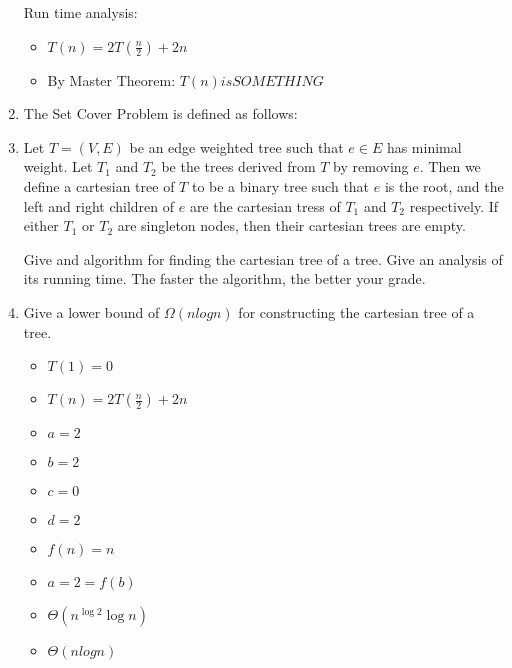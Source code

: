 \documentclass[12pt]{article}
\begin{document}
\begin{enumerate}
    Run time analysis:
    \begin{itemize}
        \item $T(n) = 2T(\frac{n}{2}) + 2n$
        \item By Master Theorem: $T(n) is SOMETHING$
    \end{itemize}

\item The Set Cover Problem is defined as follows:

\item Let $T = (V,E)$ be an edge weighted tree such that $e \in E$ has minimal
    weight.  Let $T_1$ and $T_2$ be the trees derived from $T$ by removing $e$.
    Then we define a cartesian tree of $T$ to be a binary tree such that $e$ is
    the root, and the left and right children of $e$ are the cartesian tress of
    $T_1$ and $T_2$ respectively. If either $T_1$ or $T_2$ are singleton nodes,
    then their cartesian trees are empty.

    Give and algorithm for finding the cartesian tree of a tree. Give an
    analysis of its running time. The faster the algorithm, the better your
    grade.

\item Give a lower bound of $\Omega(nlogn)$ for constructing the cartesian tree
    of a tree.

    \begin{itemize}
        \item $T(1) = 0$
        \item $T(n) = 2T(\frac{n}{2}) + 2n$
        \item $a = 2$
        \item $b = 2$
        \item $c = 0$
        \item $d = 2$
        \item $f(n) = n$
        \item $a = 2 = f(b)$
        \item $\Theta(n^{\log 2} \log n)$
        \item $\Theta(nlogn)$
    \end{itemize}

\end{enumerate}
\end{document}

